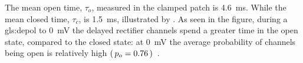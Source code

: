 \documentclass[class={myRUCProject}, crop=false]{standalone}
\begin{document}

The mean open time, \(\tau_o\), measured in the clamped patch is \qty{4.6}{\ms}. While the mean closed time, \(\tau_c\), is \qty{1.5}{\ms}, illustrated by . As seen in the figure, during a \gls{gls:depol} to \qty{0}{\mV} the delayed rectifier channels spend a greater time in the open state, compared to the closed state: at \qty{0}{\mV} the average probability of channels being open is relatively high \(\left(\,p_o = 0.76\,\right)\)~\cite{Hammond2015ch4}.
\end{document}
